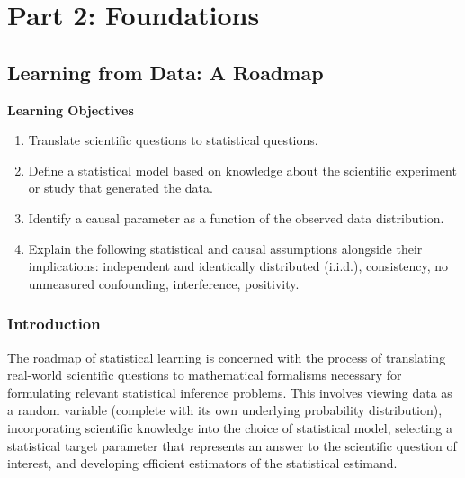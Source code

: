 \documentclass[
  12pt, krantz2,
]{krantz}
\providecommand{\tightlist}{%
  \setlength{\itemsep}{0pt}\setlength{\parskip}{0pt}}
\newcommand{\1}{\mathbbm{1}}
\newenvironment{infobox}{
  \definecolor{shadecolor}{rgb}{0.0, 1.0, 1.0}
  \color{black}
  \begin{shaded}
    }{
  \end{shaded}
}
\theoremstyle{definition}
\theoremstyle{definition}
\theoremstyle{definition}
\theoremstyle{definition}
\theoremstyle{remark}
\begin{document}
\hypertarget{part-part-2-foundations}{%
\part{Part 2: Foundations}\label{part-part-2-foundations}}

\hypertarget{roadmap}{%
\chapter{Learning from Data: A Roadmap}\label{roadmap}}

\begin{infobox}

\begin{center}
\textbf{Learning Objectives}

\end{center}

\begin{enumerate}
\def\labelenumi{\arabic{enumi}.}
\tightlist
\item
  Translate scientific questions to statistical questions.
\item
  Define a statistical model based on knowledge about the scientific experiment
  or study that generated the data.
\item
  Identify a causal parameter as a function of the observed data distribution.
\item
  Explain the following statistical and causal assumptions alongside their
  implications: independent and identically distributed (i.i.d.), consistency,
  no unmeasured confounding, interference, positivity.
\end{enumerate}

\end{infobox}

\hypertarget{introduction-1}{%
\section*{Introduction}\label{introduction-1}}


The roadmap of statistical learning is concerned with the process of translating
real-world scientific questions to mathematical formalisms
necessary for formulating relevant statistical inference problems.
This involves viewing data as a random variable (complete with its own
underlying probability distribution), incorporating scientific knowledge into
the choice of statistical model, selecting a statistical target parameter that
represents an answer to the scientific question of interest, and developing
efficient estimators of the statistical estimand.
\end{document}
